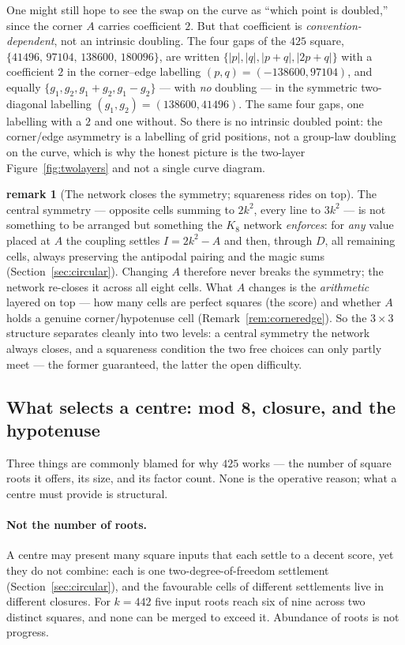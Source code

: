 \documentclass[11pt]{article}
\theoremstyle{definition}
\newtheorem{remark}{remark}
\begin{document}
\noindent One might still hope to see the swap on the curve as ``which point is doubled,''
since the corner $A$ carries coefficient $2$. But that coefficient is
\emph{convention-dependent}, not an intrinsic doubling. The four gaps of the $425$ square,
$\{41496,\,97104,\,138600,\,180096\}$, are written $\{|p|,|q|,|p{+}q|,|2p{+}q|\}$ with a
coefficient $2$ in the corner--edge labelling $(p,q)=(-138600,97104)$, and equally
$\{g_1,g_2,g_1{+}g_2,g_1{-}g_2\}$ --- with \emph{no} doubling --- in the symmetric
two-diagonal labelling $(g_1,g_2)=(138600,41496)$. The same four gaps, one labelling with a
$2$ and one without. So there is no intrinsic doubled point: the corner/edge asymmetry is a
labelling of grid positions, not a group-law doubling on the curve, which is why the honest
picture is the two-layer Figure~\ref{fig:twolayers} and not a single curve diagram.

\begin{remark}[The network closes the symmetry; squareness rides on top]\label{rem:symmarith}
The central symmetry --- opposite cells summing to $2k^2$, every line to $3k^2$ --- is not
something to be arranged but something the $K_8$ network \emph{enforces}: for \emph{any} value
placed at $A$ the coupling settles $I=2k^2-A$ and then, through $D$, all remaining cells,
always preserving the antipodal pairing and the magic sums (Section~\ref{sec:circular}).
Changing $A$ therefore never breaks the symmetry; the network re-closes it across all eight
cells. What $A$ changes is the \emph{arithmetic} layered on top --- how many cells are perfect
squares (the score) and whether $A$ holds a genuine corner/hypotenuse cell
(Remark~\ref{rem:corneredge}). So the $3\times3$ structure separates cleanly into two levels:
a central symmetry the network always closes, and a squareness condition the two free choices
can only partly meet --- the former guaranteed, the latter the open difficulty.
\end{remark}

\subsection{What selects a centre: mod 8, closure, and the hypotenuse}\label{sec:selectk}

Three things are commonly blamed for why $425$ works --- the number of square roots it
offers, its size, and its factor count. None is the operative reason; what a centre must
provide is structural.

\paragraph{Not the number of roots.} A centre may present many square inputs that each
settle to a decent score, yet they do not combine: each is one two-degree-of-freedom
settlement (Section~\ref{sec:circular}), and the favourable cells of different settlements
live in different closures. For $k=442$ five input roots reach six of nine across two
distinct squares, and none can be merged to exceed it. Abundance of roots is not progress.
\end{document}
